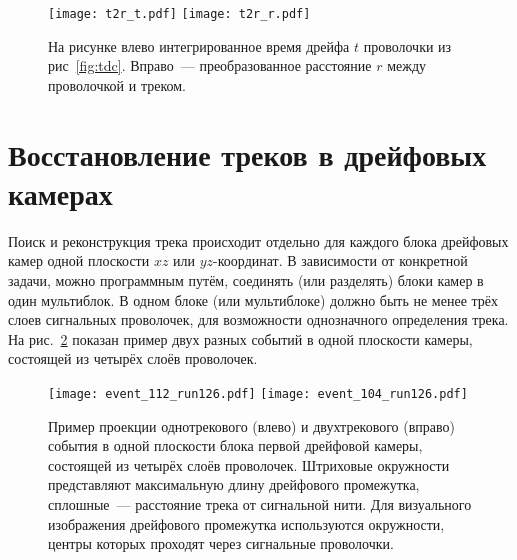 \begin{figure}[h]
  \centering
  \texttt{[image: t2r\_t.pdf]} \hfill
  \texttt{[image: t2r\_r.pdf]}
  \caption{На рисунке влево интегрированное время дрейфа $t$ проволочки из
    рис~\ref{fig:tdc}. Вправо~--- преобразованное расстояние $r$ между
    проволочкой и треком.}
  \label{fig:t2r}
\end{figure}

\section{Восстановление треков в дрейфовых камерах}
Поиск и реконструкция трека происходит отдельно для каждого блока
дрейфовых камер одной плоскости $xz$ или $yz$-координат. В зависимости от
конкретной задачи, можно программным путём, соединять (или разделять) блоки
камер в один мультиблок. В одном блоке (или мультиблоке) должно быть не менее
трёх слоев сигнальных проволочек, для возможности однозначного определения
трека. На рис.~\ref{fig:typo_2events} показан пример двух разных событий в одной
плоскости камеры, состоящей из четырёх слоёв проволочек.

\begin{figure}[h]
  \centering
  \texttt{[image: event\_112\_run126.pdf]} \hfill
  \texttt{[image: event\_104\_run126.pdf]}
  \caption{Пример проекции однотрекового (влево) и двухтрекового (вправо)
    события в одной плоскости блока первой дрейфовой камеры, состоящей из
    четырёх слоёв проволочек. Штриховые окружности представляют максимальную
    длину дрейфового промежутка, сплошные~--- расстояние трека от сигнальной
    нити. Для визуального изображения дрейфового промежутка используются
    окружности, центры которых проходят через сигнальные проволочки.}
  \label{fig:typo_2events}
\end{figure}


